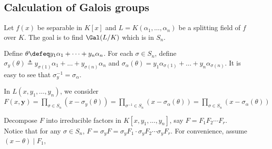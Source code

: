 \subsection{Calculation of Galois groups}
Let $f(x)$ be separable in $K[x]$ and $L = K(\alpha_1, \dots, \alpha_n)$ be a splitting field of
$f$ over $K$. The goal is to find $\Gal(L/K)$ which is in $S_n$.

Define $\theta \defeq y_1 \alpha_1 + \dots + y_n \alpha_n$. For each $\sigma \in S_n$,
define $\sigma_y(\theta) \triangleq y_{\sigma(1)} \alpha_1 + \dots + y_{\sigma(n)} \alpha_n$ and
$\sigma_{\alpha}(\theta) = y_1 \alpha_{\sigma(1)} + \dots + y_n \alpha_{\sigma(n)}$.
It is easy to see that $\sigma_y^{-1} = \sigma_\alpha$. 

In $L(x, y_1, \dots, y_n)$, we consider $F(x, \bm{y}) = \prod_{\sigma \in S_n} (x - \sigma_y(\theta))
= \prod_{\sigma^{-1} \in S_n} (x - \sigma_{\alpha}(\theta)) = \prod_{\sigma \in S_n} (x - \sigma_\alpha(\theta))$

Decompose $F$ into irreducible factors in $K[x, y_1, \dots, y_n]$, say $F = F_1 F_2 \dotsm F_r$.
Notice that for any $\sigma \in S_n$, $F = \sigma_y F = \sigma_y F_1 \cdot \sigma_y F_2 \dotsm \sigma_y F_r$.
For convenience, assume $(x - \theta) \mid F_1$, 

